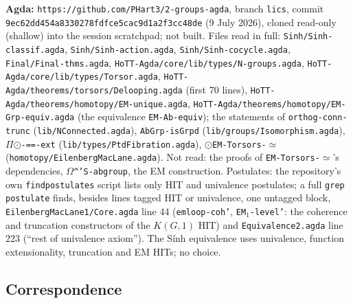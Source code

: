 \documentclass[11pt]{amsart}
\theoremstyle{definition}
\theoremstyle{remark}
\newcommand{\code}[1]{\texttt{#1}}
\begin{document}
\noindent\textbf{Agda:} \code{https://github.com/PHart3/2-groups-agda}, branch
\code{lics}, commit \code{9ec62dd454a8330278fdfce5cac9d1a2f3cc48de} (9 July
2026), cloned read-only (shallow) into the session scratchpad; not built. Files
read in full: \code{Sinh/Sinh-classif.agda}, \code{Sinh/Sinh-action.agda},
\code{Sinh/Sinh-cocycle.agda}, \code{Final/Final-thms.agda},
\code{HoTT-Agda/core/lib/types/N-groups.agda},
\code{HoTT-Agda/core/lib/types/Torsor.agda},
\code{HoTT-Agda/theorems/torsors/Delooping.agda} (first 70 lines),
\code{HoTT-Agda/theorems/homotopy/EM-unique.agda},
\code{HoTT-Agda/theorems/homotopy/EM-Grp-equiv.agda} (the equivalence
\code{EM-Ab-equiv}); the statements of \code{orthog-conn-trunc}
(\code{lib/NConnected.agda}), \code{AbGrp-isGrpd}
(\code{lib/groups/Isomorphism.agda}), \code{\ensuremath{\Pi}\ensuremath{\odot}-==-ext}
(\code{lib/types/PtdFibration.agda}), \code{\ensuremath{\odot}EM-Torsors-\ensuremath{\simeq}}
(\code{homotopy/EilenbergMacLane.agda}). Not read: the proofs of
\code{EM-Torsors-\ensuremath{\simeq}}'s dependencies, \code{\ensuremath{\Omega}\textasciicircum{}'S-abgroup}, the EM construction.
Postulates: the repository's own \code{findpostulates} script lists only
HIT and univalence postulates; a full \code{grep postulate} finds, besides lines tagged HIT
or univalence, one untagged block, \code{EilenbergMacLane1/Core.agda} line 44
(\code{emloop-coh'}, \code{EM\ensuremath{_1}-level'}: the coherence and truncation constructors of the
$K(G,1)$ HIT) and \code{Equivalence2.agda} line 223 (``rest of univalence axiom''). The Sính equivalence uses
univalence, function extensionality, truncation and EM HITs; no choice.

\subsection*{Correspondence}
\end{document}
